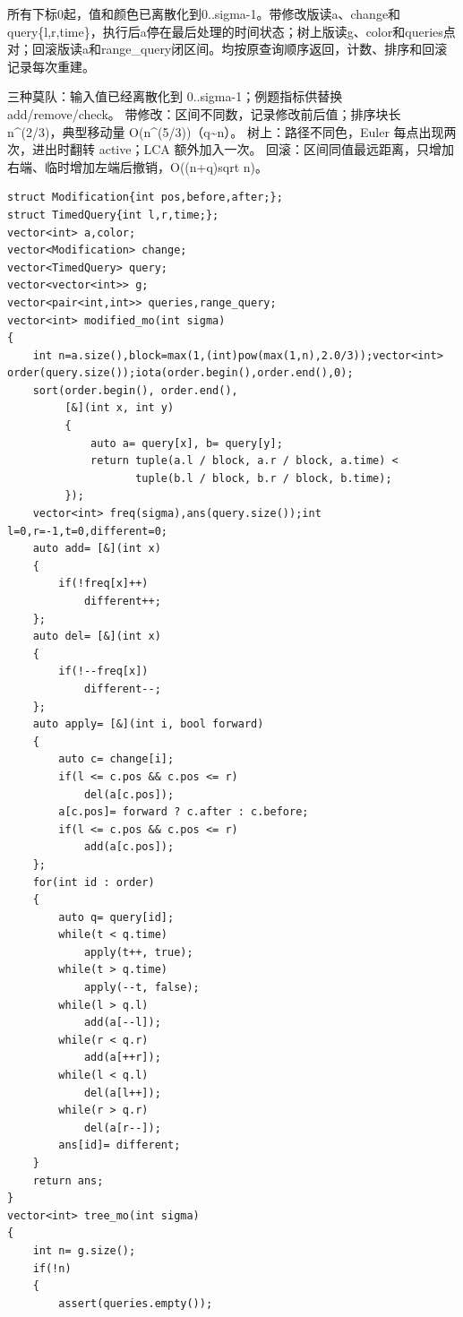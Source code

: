 \documentclass[UTF8,fontset=fandol,a4paper,twoside]{ctexart}
\newcommand{\note}[1]{{\fontsize{10}{12}\selectfont #1\par}}
\begin{document}
\begin{multicols}{2}
\note{所有下标0起，值和颜色已离散化到0.\allowbreak{}.\allowbreak{}sigma-\allowbreak{}1。带修改版读a、change和query\{l,\allowbreak{}r,\allowbreak{}time\}，执行后a停在最后处理的时间状态；树上版读g、color和queries点对；回滚版读a和range\_query闭区间。均按原查询顺序返回，计数、排序和回滚记录每次重建。}
\note{三种莫队：输入值已经离散化到 0.\allowbreak{}.\allowbreak{}sigma-\allowbreak{}1；例题指标供替换 add/\allowbreak{}remove/\allowbreak{}check。 带修改：区间不同数，记录修改前后值；排序块长 n\textasciicircum{}(\allowbreak{}2/\allowbreak{}3)\allowbreak{}，典型移动量 O(\allowbreak{}n\textasciicircum{}(\allowbreak{}5/\allowbreak{}3)\allowbreak{})\allowbreak{}（q\textasciitilde{}n）。 树上：路径不同色，Euler 每点出现两次，进出时翻转 active；LCA 额外加入一次。 回滚：区间同值最远距离，只增加右端、临时增加左端后撤销，O(\allowbreak{}(\allowbreak{}n+\allowbreak{}q)\allowbreak{}sqrt n)\allowbreak{}。}
\begin{lstlisting}
struct Modification{int pos,before,after;};
struct TimedQuery{int l,r,time;};
vector<int> a,color;
vector<Modification> change;
vector<TimedQuery> query;
vector<vector<int>> g;
vector<pair<int,int>> queries,range_query;
vector<int> modified_mo(int sigma)
{
    int n=a.size(),block=max(1,(int)pow(max(1,n),2.0/3));vector<int> order(query.size());iota(order.begin(),order.end(),0);
    sort(order.begin(), order.end(),
         [&](int x, int y)
         {
             auto a= query[x], b= query[y];
             return tuple(a.l / block, a.r / block, a.time) <
                    tuple(b.l / block, b.r / block, b.time);
         });
    vector<int> freq(sigma),ans(query.size());int l=0,r=-1,t=0,different=0;
    auto add= [&](int x)
    {
        if(!freq[x]++)
            different++;
    };
    auto del= [&](int x)
    {
        if(!--freq[x])
            different--;
    };
    auto apply= [&](int i, bool forward)
    {
        auto c= change[i];
        if(l <= c.pos && c.pos <= r)
            del(a[c.pos]);
        a[c.pos]= forward ? c.after : c.before;
        if(l <= c.pos && c.pos <= r)
            add(a[c.pos]);
    };
    for(int id : order)
    {
        auto q= query[id];
        while(t < q.time)
            apply(t++, true);
        while(t > q.time)
            apply(--t, false);
        while(l > q.l)
            add(a[--l]);
        while(r < q.r)
            add(a[++r]);
        while(l < q.l)
            del(a[l++]);
        while(r > q.r)
            del(a[r--]);
        ans[id]= different;
    }
    return ans;
}
vector<int> tree_mo(int sigma)
{
    int n= g.size();
    if(!n)
    {
        assert(queries.empty());

\end{lstlisting}
\end{multicols}
\end{document}
